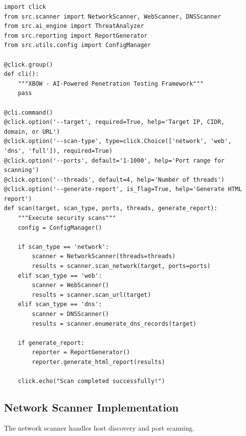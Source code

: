 \documentclass[12pt,a4paper]{report}
\begin{document}
\begin{lstlisting}[caption=CLI Module Implementation]
import click
from src.scanner import NetworkScanner, WebScanner, DNSScanner
from src.ai_engine import ThreatAnalyzer
from src.reporting import ReportGenerator
from src.utils.config import ConfigManager

@click.group()
def cli():
    """XBOW - AI-Powered Penetration Testing Framework"""
    pass

@cli.command()
@click.option('--target', required=True, help='Target IP, CIDR, domain, or URL')
@click.option('--scan-type', type=click.Choice(['network', 'web', 'dns', 'full']), required=True)
@click.option('--ports', default='1-1000', help='Port range for scanning')
@click.option('--threads', default=4, help='Number of threads')
@click.option('--generate-report', is_flag=True, help='Generate HTML report')
def scan(target, scan_type, ports, threads, generate_report):
    """Execute security scans"""
    config = ConfigManager()
    
    if scan_type == 'network':
        scanner = NetworkScanner(threads=threads)
        results = scanner.scan_network(target, ports=ports)
    elif scan_type == 'web':
        scanner = WebScanner()
        results = scanner.scan_url(target)
    elif scan_type == 'dns':
        scanner = DNSScanner()
        results = scanner.enumerate_dns_records(target)
    
    if generate_report:
        reporter = ReportGenerator()
        reporter.generate_html_report(results)
    
    click.echo("Scan completed successfully!")
\end{lstlisting}

\subsection{Network Scanner Implementation}

The network scanner handles host discovery and port scanning.
\end{document}

